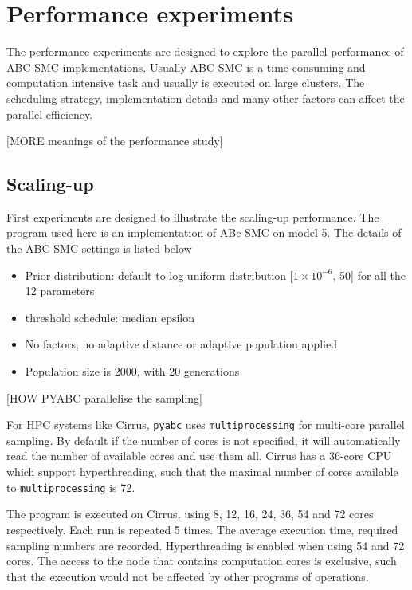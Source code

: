 \documentclass[12pt,a4paper]{report}
\begin{document}
\chapter{Performance experiments}

The performance experiments are designed to explore the parallel performance of ABC SMC implementations. Usually ABC SMC is a time-consuming and computation intensive task and usually is executed on large clusters. The scheduling strategy, implementation details and many other factors can affect the parallel efficiency.

[MORE meanings of the performance study]

\section{Scaling-up}

First experiments are designed to illustrate the scaling-up performance. The program used here is an implementation of ABc SMC on model 5. The details of the ABC SMC settings is listed below

\begin{itemize}
    \item Prior distribution: default to log-uniform distribution [$1\times 10^{-6}$, 50] for all the 12 parameters
    \item threshold schedule: median epsilon
    \item No factors, no adaptive distance or adaptive population applied
    \item Population size is 2000, with 20 generations
\end{itemize}

[HOW PYABC parallelise the sampling]

For HPC systems like Cirrus, \verb|pyabc| uses \verb|multiprocessing| for multi-core parallel sampling. By default if the number of cores is not specified, it will automatically read the number of available cores and use them all. Cirrus has a 36-core CPU which support hyperthreading, such that the maximal number of cores available to \verb|multiprocessing| is 72.

The program is executed on Cirrus, using 8, 12, 16, 24, 36, 54 and 72 cores respectively. Each run is repeated 5 times. The average execution time, required sampling numbers are recorded. Hyperthreading is enabled when using 54 and 72 cores. The access to the node that contains computation cores is exclusive, such that the execution would not be affected by other programs of operations.
\end{document}
